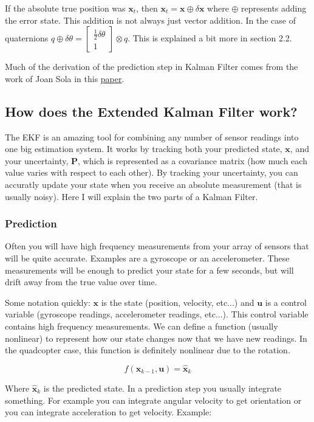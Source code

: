 \documentclass[11pt]{article}
\renewcommand{\vec}[1]{\mathbf{#1}}
\renewcommand{\tilde}[1]{\expandafter\hat{#1}}
\newcommand{\mat}[1]{\mathbf{#1}}
\begin{document}
If the absolute true position was $\vec{x}_t$, then $\vec{x}_t = \vec{x} \oplus \delta\vec{x}$ where $\oplus$ represents adding the error state. This addition is not always just vector addition. In the case of quaternions $q \oplus \delta \theta =  \begin{bmatrix}
\frac{1}{2}\delta\theta\\
1
\end{bmatrix} \otimes q$. This is explained a bit more in section 2.2.

Much of the derivation of the prediction step in Kalman Filter comes from the work of Joan Sola in this \href{http://www.iri.upc.edu/people/jsola/JoanSola/objectes/notes/kinematics.pdf}{paper}.
\subsection{How does the Extended Kalman Filter work?}
The EKF is an amazing tool for combining any number of sensor readings into one big estimation system. It works by tracking both your predicted state, $\vec{x}$, and your uncertainty, $\mat{P}$, which is represented as a covariance matrix (how much each value varies with respect to each other). By tracking your uncertainty, you can accuratly update your state when you receive an absolute measurement (that is usually noisy). Here I will explain the two parts of a Kalman Filter.
\subsubsection{Prediction}
	Often you will have high frequency measurements from your array of sensors that will be quite accurate. Examples are a gyroscope or an accelerometer. These measurements will be enough to predict your state for a few seconds, but will drift away from the true value over time.
	
Some notation quickly: $\vec{x}$ is the state (position, velocity, etc...) and $\vec{u}$ is a control variable (gyroscope readings, accelerometer readings, etc...). This control variable contains high frequency measurements. We can define a function (usually nonlinear) to represent how our state changes now that we have new readings. In the quadcopter case, this function is definitely nonlinear due to the rotation.

$$f(\vec{x}_{k-1}, \vec{u}) = \vec{\tilde{x}}_k$$

Where $\vec{\tilde{x}}_k$ is the predicted state. In a prediction step you usually integrate something. For example you can integrate angular velocity to get orientation or you can integrate acceleration to get velocity. Example:
\end{document}

